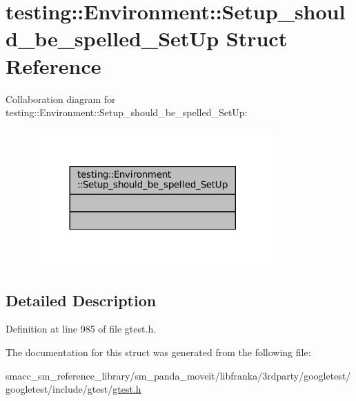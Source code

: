 \hypertarget{structtesting_1_1Environment_1_1Setup__should__be__spelled__SetUp}{}\section{testing\+:\+:Environment\+:\+:Setup\+\_\+should\+\_\+be\+\_\+spelled\+\_\+\+Set\+Up Struct Reference}
\label{structtesting_1_1Environment_1_1Setup__should__be__spelled__SetUp}


Collaboration diagram for testing\+:\+:Environment\+:\+:Setup\+\_\+should\+\_\+be\+\_\+spelled\+\_\+\+Set\+Up\+:
\nopagebreak
\begin{figure}[H]
\begin{center}
\leavevmode
\includegraphics[width=260pt]{structtesting_1_1Environment_1_1Setup__should__be__spelled__SetUp__coll__graph}
\end{center}
\end{figure}


\subsection{Detailed Description}


Definition at line 985 of file gtest.\+h.



The documentation for this struct was generated from the following file\+:\begin{DoxyCompactItemize}
\item 
smacc\+\_\+sm\+\_\+reference\+\_\+library/sm\+\_\+panda\+\_\+moveit/libfranka/3rdparty/googletest/googletest/include/gtest/\hyperlink{gtest_8h}{gtest.\+h}\end{DoxyCompactItemize}
